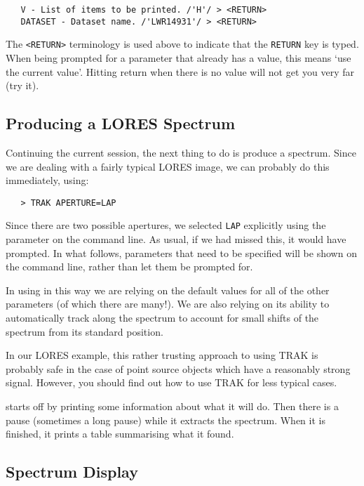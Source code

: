 \begin{verbatim}
   V - List of items to be printed. /'H'/ > <RETURN>
   DATASET - Dataset name. /'LWR14931'/ > <RETURN>
\end{verbatim}

The \verb+<RETURN>+ terminology is used above to indicate that the
\verb+RETURN+ key is typed.  When being prompted for a parameter that already
has a value, this means `use the current value'\@.  Hitting return when there
is no value will not get you very far (try it)\@.


\subsection{Producing a LORES Spectrum}

Continuing the current session, the next thing to do is produce a
spectrum.  Since we are dealing with a fairly typical LORES image, we can
probably do this immediately, using:

\begin{verbatim}
   > TRAK APERTURE=LAP
\end{verbatim}

Since there are two possible apertures, we selected \verb+LAP+ explicitly using
the  parameter on the command line.  As usual, if we had missed
this, it would have prompted.  In what follows, parameters that need to be
specified will be shown on the command line, rather than let them be prompted
for.

In using  in this way we are relying on the default values for all of
the other parameters (of which there are many!)\@.  We are also relying on its
ability to automatically track along the spectrum to account for small
shifts of the spectrum from its standard position.

In our LORES example, this rather trusting approach to using TRAK is
probably safe in the case of point source objects which have a reasonably
strong signal.  However, you should find out how to use TRAK for less typical
cases.

 starts off by printing some information about what it will do.  Then
there is a pause (sometimes a long pause) while it extracts the spectrum.  When
it is finished, it prints a table summarising what it found.


\subsection{Spectrum Display}

